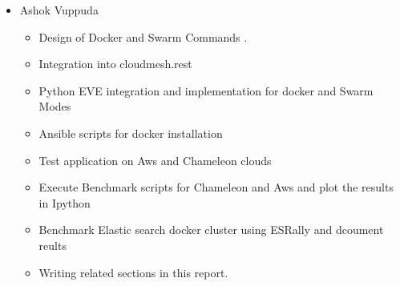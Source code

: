 \documentclass[9pt,twocolumn,twoside]{../../styles/osajnl}
\begin{document}
\begin{itemize}
\item Ashok Vuppuda
    \begin{itemize}
    \item Design of Docker and Swarm Commands .
    \item Integration into cloudmesh.rest
    \item Python EVE integration and implementation for docker and Swarm Modes
    \item Ansible scripts for docker installation
    \item Test application on Aws and Chameleon clouds
    \item Execute Benchmark scripts for Chameleon and Aws and plot the results in Ipython
    \item Benchmark Elastic search docker  cluster using ESRally and dcoument reults
    \item Writing related sections in this report.
    \end{itemize}
\end{itemize}





 


\newpage

\appendix
\end{document}
